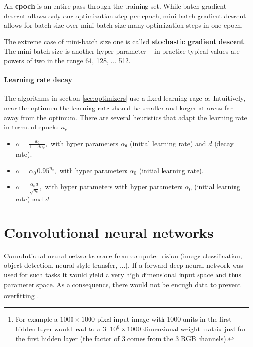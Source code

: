\documentclass[12pt,a4paper]{article}
\begin{document}
An \textbf{epoch} is an entire pass through the training set. While batch gradient descent allows only one optimization step per epoch, mini-batch gradient descent allows for batch size over mini-batch size many optimization steps in one epoch. 

The extreme case of mini-batch size one is called \textbf{stochastic gradient descent}. The mini-batch size is another hyper parameter -- in practice typical values are powers of two in the range 64, 128, ... 512.

\paragraph{Learning rate decay} The algorithms in section  \ref{sec:optimizers} use a fixed learning rage $\alpha$. Intuitively, near the optimum the learning rate should be smaller and larger at areas far away from the optimum. There are several heuristics that adapt the learning rate in terms of epochs $n_e$
\begin{itemize}\setlength\itemsep{0em}
	 \item 
	 	  $ \alpha = \frac{\alpha_0}{1+ d n_e}, $ with hyper parameters $\alpha_0$ (initial learning rate) and $d$ (decay rate).
	 \item $ \alpha = \alpha_0\,0.95^{n_e}, $ with hyper parameters $\alpha_0$ (initial learning rate).
	 \item  $ \alpha = \frac{\alpha_0\,d}{\sqrt{n_e}}, $ with hyper parameters with hyper parameters $\alpha_0$ (initial learning rate) and $d$.
	 	  
\end{itemize} 


\section{Convolutional neural networks}
Convolutional neural networks come from computer vision (image classification, object detection, neural style transfer, ...). If a forward deep neural network was used for such tasks it would yield a very high dimensional input space and thus parameter space. As a consequence, there would not be enough data to prevent overfitting\footnote{For example a $1000\times 1000$ pixel input image with 1000 units in the first hidden layer would lead to a $3\cdot10^6 \times 1000$ dimensional weight matrix just for the first hidden layer (the factor of 3 comes from the 3 RGB channels).}.  
\end{document}
